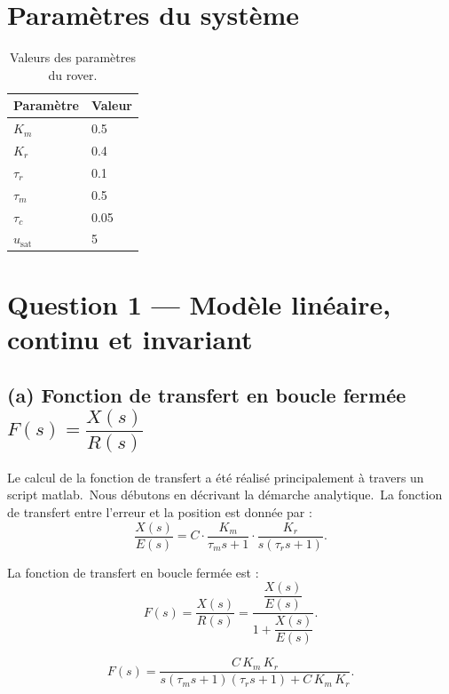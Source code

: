 \documentclass[12pt]{article}
\begin{document}
    \section{Paramètres du système}
    \begin{table}[H]
        \centering
        \caption{Valeurs des paramètres du rover.}
        \begin{tabular}{@{}ll@{}}
            \toprule
            Paramètre & Valeur \\
            \midrule
            $K_m$ & 0.5 \\
            $K_r$ & 0.4 \\
            $\tau_r$ & 0.1 \\
            $\tau_m$ & 0.5 \\
            $\tau_c$ & 0.05 \\
            $u_{\text{sat}}$ & 5 \\
            \bottomrule
        \end{tabular}\label{tab:table}
    \end{table}

    \section{Question 1 — Modèle linéaire, continu et invariant}
    \subsection[(a) Fonction de transfert en boucle fermée]{(a) Fonction de transfert en boucle fermée $F(s)=\dfrac{X(s)}{R(s)}$}
    Le calcul de la fonction de transfert a été réalisé principalement à travers un script matlab.\  Nous débutons en décrivant la démarche analytique.\  La fonction de transfert entre l'erreur et la position est donnée par :
    \[
        \frac{X(s)}{E(s)} =
        C \cdot \frac{K_m}{\tau_m s + 1} \cdot \frac{K_r}{s(\tau_r s + 1)}.
    \]

    La fonction de transfert en boucle fermée est :
    \[
        F(s) = \frac{X(s)}{R(s)} =
        \frac{\dfrac{X(s)}{E(s)}}{1 + \dfrac{X(s)}{E(s)}}.
    \]

    \[
        F(s) =  \frac{
            C\,K_m\,K_r}{
            s(\tau_m s + 1)(\tau_r s + 1) + C\,K_m\,K_r
        }.
    \]
\end{document}
